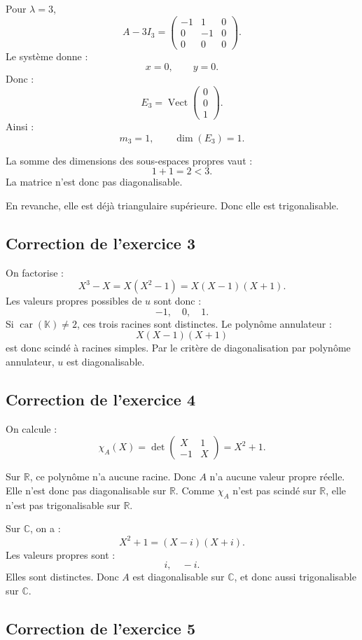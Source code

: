 \documentclass[11pt,a4paper]{article}
\newcommand{\K}{\mathbb K}
\newcommand{\R}{\mathbb R}
\newcommand{\C}{\mathbb C}
\newcommand{\Vect}{\operatorname{Vect}}
\begin{document}
Pour \(\lambda=3\),
\[
A-3I_3=
\begin{pmatrix}
-1&1&0\\
0&-1&0\\
0&0&0
\end{pmatrix}.
\]
Le système donne :
\[
x=0,\qquad y=0.
\]
Donc :
\[
E_3=\Vect
\begin{pmatrix}
0\\0\\1
\end{pmatrix}.
\]
Ainsi :
\[
m_3=1,
\qquad
\dim(E_3)=1.
\]

La somme des dimensions des sous-espaces propres vaut :
\[
1+1=2<3.
\]
La matrice n'est donc pas diagonalisable.

En revanche, elle est déjà triangulaire supérieure.  
Donc elle est trigonalisable.

\subsection*{Correction de l'exercice 3}

On factorise :
\[
X^3-X=X(X^2-1)=X(X-1)(X+1).
\]
Les valeurs propres possibles de \(u\) sont donc :
\[
-1,\quad0,\quad1.
\]
Si \(\operatorname{car}(\K)\neq2\), ces trois racines sont distinctes.  
Le polynôme annulateur :
\[
X(X-1)(X+1)
\]
est donc scindé à racines simples.  
Par le critère de diagonalisation par polynôme annulateur, \(u\) est diagonalisable.

\subsection*{Correction de l'exercice 4}

On calcule :
\[
\chi_A(X)=
\det
\begin{pmatrix}
X&1\\
-1&X
\end{pmatrix}
=
X^2+1.
\]

Sur \(\R\), ce polynôme n'a aucune racine.  
Donc \(A\) n'a aucune valeur propre réelle.  
Elle n'est donc pas diagonalisable sur \(\R\).  
Comme \(\chi_A\) n'est pas scindé sur \(\R\), elle n'est pas trigonalisable sur \(\R\).

Sur \(\C\), on a :
\[
X^2+1=(X-i)(X+i).
\]
Les valeurs propres sont :
\[
i,\quad -i.
\]
Elles sont distinctes.  
Donc \(A\) est diagonalisable sur \(\C\), et donc aussi trigonalisable sur \(\C\).

\subsection*{Correction de l'exercice 5}
\end{document}
